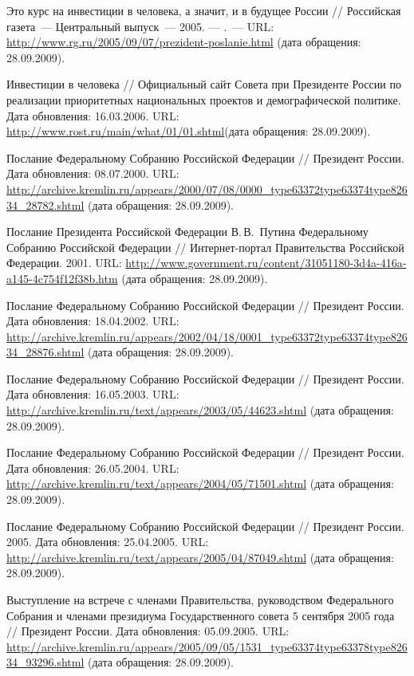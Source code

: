 \begin{thebibliography}{99}
 Это курс на инвестиции в человека, а значит, и в
  будущее России // Российская газета~--- Центральный выпуск~---
  2005. — .~--- URL:
  \url{http://www.rg.ru/2005/09/07/prezident-poslanie.html} (дата
  обращения: 28.09.2009).

 Инвестиции в человека //
  Официальный сайт Совета при Президенте России по реализации
  приоритетных национальных проектов и демографической политике. Дата
  обновления: 16.03.2006. URL:
  \url{http://www.rost.ru/main/what/01/01.shtml}(дата обращения:
  28.09.2009).

 Послание Федеральному Собранию Российской
  Федерации // Президент России. Дата обновления:
  08.07.2000.  URL:
  \url{http://archive.kremlin.ru/appears/2000/07/08/0000_type63372type63374type82634_28782.shtml}
  (дата обращения: 28.09.2009).

Послание Президента Российской Федерации
  В.\,В.~Путина Федеральному Собранию Российской Федерации
  // Интернет-портал Правительства Российской
  Федерации. 2001.  URL:
  \url{http://www.government.ru/content/31051180-3d4a-416a-a145-4c754f12f38b.htm}
  (дата обращения: 28.09.2009).

 Послание Федеральному Собранию Российской
  Федерации // Президент России. Дата обновления:
  18.04.2002. URL:
  \url{http://archive.kremlin.ru/appears/2002/04/18/0001_type63372type63374type82634_28876.shtml}
  (дата обращения: 28.09.2009).

 Послание Федеральному Собранию Российской
  Федерации // Президент России. Дата обновления:
  16.05.2003. URL:
  \url{http://archive.kremlin.ru/text/appears/2003/05/44623.shtml}
  (дата обращения: 28.09.2009).

 Послание Федеральному Собранию Российской
  Федерации // Президент России. Дата обновления:
  26.05.2004. URL:
  \url{http://archive.kremlin.ru/text/appears/2004/05/71501.shtml}
  (дата обращения: 28.09.2009).

 Послание Федеральному Собранию Российской
  Федерации // Президент России. 2005. Дата
  обновления: 25.04.2005. URL:
  \url{http://archive.kremlin.ru/text/appears/2005/04/87049.shtml}
  (дата обращения: 28.09.2009).

 Выступление на встрече с членами Правительства,
  руководством Федерального Собрания и членами президиума
  Государственного совета 5 сентября 2005 года //
  Президент России. Дата обновления: 05.09.2005. URL:
  \url{http://archive.kremlin.ru/appears/2005/09/05/1531_type63374type63378type82634_93296.shtml}
  (дата обращения: 28.09.2009).


\end{thebibliography}
